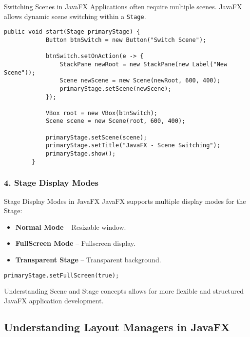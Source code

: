 \documentclass[aspectratio=169, table]{beamer}
\begin{document}
\begin{frame}[fragile]{Switching Scenes in JavaFX}
	\vspace{20pt}
	Applications often require multiple scenes. JavaFX allows dynamic scene switching within a \texttt{Stage}.
	
	\begin{lstlisting}[style=JavaStyle, caption=Switching Scenes in JavaFX]
		public void start(Stage primaryStage) {
			Button btnSwitch = new Button("Switch Scene");
			
			btnSwitch.setOnAction(e -> {
				StackPane newRoot = new StackPane(new Label("New Scene"));
				Scene newScene = new Scene(newRoot, 600, 400);
				primaryStage.setScene(newScene);
			});
			
			VBox root = new VBox(btnSwitch);
			Scene scene = new Scene(root, 600, 400);
			
			primaryStage.setScene(scene);
			primaryStage.setTitle("JavaFX - Scene Switching");
			primaryStage.show();
		}
	\end{lstlisting}
\end{frame}

\subsubsection{4. Stage Display Modes}

\begin{frame}[fragile]{Stage Display Modes in JavaFX}
	\vspace{20pt}
	JavaFX supports multiple display modes for the Stage:
	\begin{itemize}
		\item \textbf{Normal Mode} – Resizable window.
		\item \textbf{FullScreen Mode} – Fullscreen display.
		\item \textbf{Transparent Stage} – Transparent background.
	\end{itemize}
	
	\begin{lstlisting}[style=JavaStyle, caption=Enabling Fullscreen Mode in JavaFX]
		primaryStage.setFullScreen(true);
	\end{lstlisting}
	
	Understanding Scene and Stage concepts allows for more flexible and  
	structured JavaFX application development.
\end{frame}

\subsection{Understanding Layout Managers in JavaFX}
\end{document}
